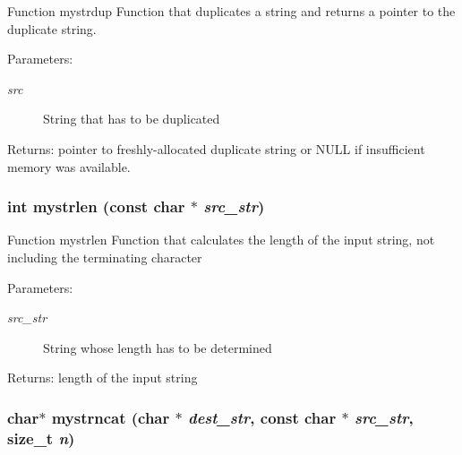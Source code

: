 Function mystrdup Function that duplicates a string and returns a pointer to the duplicate string. \begin{Desc}
\item[Parameters:]
\begin{description}
\item[{\em src}]String that has to be duplicated \end{description}
\end{Desc}
\begin{Desc}
\item[Returns:]pointer to freshly-allocated duplicate string or NULL if insufficient memory was available. \end{Desc}
\subsubsection{\setlength{\rightskip}{0pt plus 5cm}int mystrlen (const char $\ast$ {\em src\_\-str})}\label{mystring_8c_477287d2512917d6190c5c2543805cfb}


Function mystrlen Function that calculates the length of the input string, not including the terminating character \begin{Desc}
\item[Parameters:]
\begin{description}
\item[{\em src\_\-str}]String whose length has to be determined \end{description}
\end{Desc}
\begin{Desc}
\item[Returns:]length of the input string \end{Desc}
\subsubsection{\setlength{\rightskip}{0pt plus 5cm}char$\ast$ mystrncat (char $\ast$ {\em dest\_\-str}, const char $\ast$ {\em src\_\-str}, size\_\-t {\em n})}\label{mystring_8c_64269d8e515794bc11b3477159a7812d}


